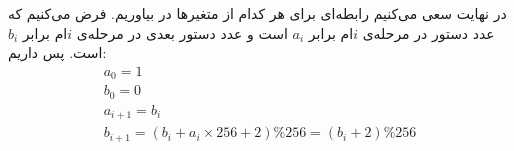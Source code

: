 \noindent
در نهایت سعی می‌کنیم رابطه‌ای برای هر کدام از متغیر‌ها در بیاوریم.
فرض می‌کنیم که عدد دستور
در مرحله‌ی 
$i$ام
برابر
$a_i$
است و عدد دستور
بعدی در مرحله‌‌ی
$i$ام
برابر
$b_i$
است.
پس داریم:
\LTR
\begin{gather*}
a_0 = 1\\
b_0 = 0\\
a_{i+1} = b_i\\
b_{i+1} = (b_i + a_i \times 256 + 2) \% 256 = (b_i + 2) \% 256
\end{gather*}
\RTL

\\
